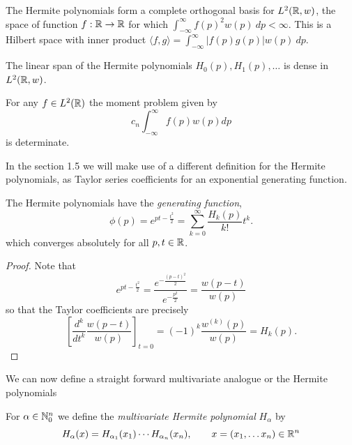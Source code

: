
The Hermite polynomials form a complete orthogonal basis for $L^2(\mathbb{R}, w)$, the space of function $f : \mathbb{R} \to \mathbb{R}$ for which $\int_{-\infty}^\infty f(p)^2 w(p)~dp < \infty$. This is a Hilbert space with inner product $\langle f, g \rangle = \int_{-\infty}^\infty |f(p)g(p)| w(p)~dp$.
\begin{proposition}
   The linear span of the Hermite polynomials $H_0(p), H_1(p), \ldots$ is dense in $L^2(\mathbb{R}, w)$.
\end{proposition}

\begin{corollary}
  For any $f \in L^2(\mathbb{R})$ the moment problem given by
  \[
    c_n \int_{-\infty}^\infty f(p) w(p) dp
  \]
  is determinate.
\end{corollary}

In the section 1.5 we will make use of a different definition for the Hermite polynomials, as Taylor series coefficients for an exponential generating function.
\begin{lemma}
  The Hermite polynomials have the \emph{generating function},
  \[
    \phi(p) = e^{pt - \frac{t^2}2} 
      = \sum_{k = 0}^\infty \frac{H_k(p)}{k!}t^k.
  \]
  which converges absolutely for all $p, t \in \mathbb{R}$.
\end{lemma}

\begin{proof}
Note that
\[
  e^{pt - \frac{t^2}2} 
    = \frac{e^{-\frac{(p-t)^2}2}}{e^{-\frac{p^2}2}} 
    = \frac{w(p - t)}{w(p)}
\]
so that the Taylor coefficients are precisely
\[
  \left[\frac{d^k}{dt^k}\frac{w(p - t)}{w(p)}\right]_{t = 0} 
    = (-1)^k \frac{w^{(k)}(p)}{w(p)} = H_k(p).
\]
\end{proof}

We can now define a straight forward multivariate analogue or the 
Hermite polynomials 

\begin{definition}
  For $\alpha \in \mathbb{N}_0^n$ we define the \emph{multivariate Hermite polynomial} $H_\alpha$ by
\[
  H_{\alpha}(x) = H_{\alpha_1}(x_1) \cdots H_{\alpha_n}(x_n), \qquad x = (x_1, \ldots x_n) \in \mathbb{R}^n 
\]
\end{definition}

